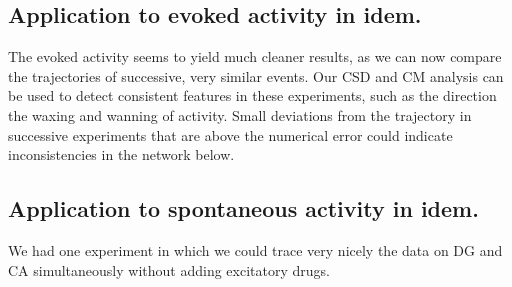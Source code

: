 \documentclass{article}
\begin{document}
\subsection{Application to evoked activity in idem.}

The evoked activity seems to yield much cleaner results, as we can now compare the trajectories of successive, very similar events. Our CSD and CM analysis can be used to detect consistent features in these experiments, such as the direction the waxing and wanning of activity. Small deviations from the trajectory in successive experiments that are above the numerical error could indicate inconsistencies in the network below. 

\subsection{Application to spontaneous activity in idem.}

We had one experiment in which we could trace very nicely the data on DG and CA simultaneously without adding excitatory drugs. 


 
\end{document}
